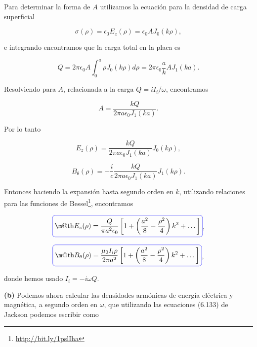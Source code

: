 \documentclass[a4paper,11pt]{article}
\makeatletter
\numberwithin{equation}{section}
\newcommand*{\boxcolor}{blue}
\renewcommand{\boxed}[1]{\textcolor{\boxcolor}{%
\tikz[baseline={([yshift=-1ex]current bounding box.center)}] \node [rectangle, minimum width=1ex,rounded corners,draw] {\normalcolor\m@th$\displaystyle#1$};}}
\makeatother
\begin{document}
Para determinar la forma de $A$ utilizamos la ecuación para la densidad de 
carga superficial 

\begin{equation}
 \sigma(\rho) = \epsilon_0E_z(\rho) = \epsilon_0 A J_0(k\rho),
\end{equation}

e integrando encontramos que la carga total en la placa es 

\begin{equation}
 Q = 2\pi\epsilon_0A \int_0^a \rho J_0(k\rho) d\rho = 2\pi\epsilon_0\frac{a}{k} 
 AJ_1(ka).
\end{equation}

Resolviendo para $A$, relacionada a la carga $Q = iI_i/\omega$, encontramos 

\begin{equation}
 A = \frac{kQ}{2\pi a \epsilon_0 J_1(ka)}.
\end{equation}

Por lo tanto 

\begin{equation}
 E_z(\rho) = \frac{kQ}{2\pi a \epsilon_0 J_1(ka)} J_0(k\rho),
\end{equation}


\begin{equation}
 B_\theta(\rho) = - \frac{i}{c} \frac{kQ}{2\pi a \epsilon_0 J_1(ka)} J_1(k\rho).
\end{equation}

Entonces haciendo la expansión hasta segundo orden en $k$, utilizando relaciones 
para las funciones de Bessel\footnote{\href{http://bit.ly/1pslIha}{http://bit.ly/1pslIha}},
encontramos 

\begin{equation}
 \boxed{E_z(\rho) = \frac{Q}{\pi a^2 \epsilon_0}\left[1 + \left(\frac{a^2}{8} - \frac{\rho^2}{4}
 \right)k^2 + \dots \right]},
\end{equation}

\begin{equation}
 \boxed{B_\theta(\rho) = \frac{\mu_0I_i\rho}{2\pi a^2}\left[1 + \left(\frac{a^2}{8} - \frac{\rho^2}{4}
 \right)k^2 + \dots \right]},
\end{equation}

donde hemos usado $I_i = - i\omega Q$. 

\vspace{.3cm}

\textbf{(b)} Podemos ahora calcular las densidades armónicas de energía eléctrica 
y magnética, a segundo orden en $\omega$, que utilizando las ecuaciones (6.133) de 
Jackson \cite{jackson} podemos escribir como 
\end{document}

